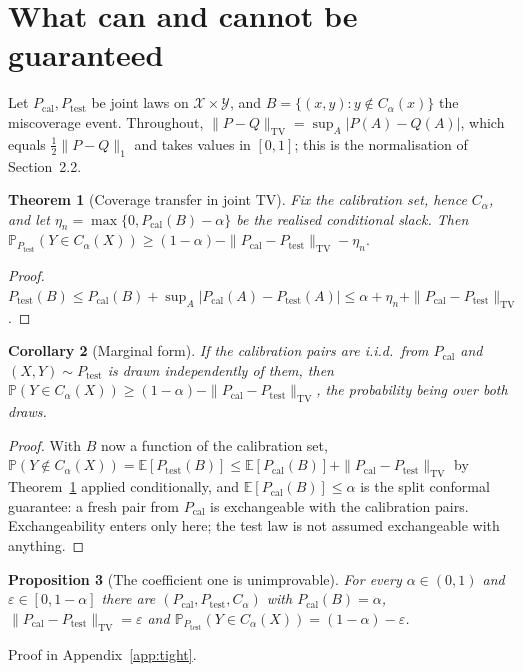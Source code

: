 \documentclass{article}
\newtheorem{theorem}{Theorem}
\newtheorem{proposition}[theorem]{Proposition}
\newtheorem{corollary}[theorem]{Corollary}
\renewcommand{\P}{\mathbb{P}}
\newcommand{\TV}[2]{\|#1 - #2\|_{\mathrm{TV}}}
\newcommand{\Pcal}{P_{\mathrm{cal}}}
\newcommand{\Ptest}{P_{\mathrm{test}}}
\begin{document}
\section{What can and cannot be guaranteed}
\label{sec:main}

Let $\Pcal,\Ptest$ be joint laws on $\mathcal X\times\mathcal Y$, and
$B=\{(x,y):y\notin C_\alpha(x)\}$ the miscoverage event. Throughout,
$\TV{P}{Q}=\sup_A|P(A)-Q(A)|$, which equals $\tfrac12\|P-Q\|_1$ and
takes values in $[0,1]$; this is the normalisation of Section~2.2.

\begin{theorem}[Coverage transfer in joint TV]
\label{thm:tv}
Fix the calibration set, hence $C_\alpha$, and let
$\eta_n=\max\{0,\Pcal(B)-\alpha\}$ be the realised conditional slack. Then
$\P_{\Ptest}(Y\in C_\alpha(X))\ge(1-\alpha)-\TV{\Pcal}{\Ptest}-\eta_n.$
\end{theorem}
\begin{proof}
$\Ptest(B)\le\Pcal(B)+\sup_A|\Pcal(A)-\Ptest(A)|
\le\alpha+\eta_n+\TV{\Pcal}{\Ptest}$.
\end{proof}

\begin{corollary}[Marginal form]
\label{cor:marginal}
If the calibration pairs are i.i.d.\ from $\Pcal$ and $(X,Y)\sim\Ptest$ is
drawn independently of them, then
$\P(Y\in C_\alpha(X))\ge(1-\alpha)-\TV{\Pcal}{\Ptest}$, the probability
being over both draws.
\end{corollary}
\begin{proof}
With $B$ now a function of the calibration set,
$\P(Y\notin C_\alpha(X))=\mathbb E[\Ptest(B)]\le\mathbb E[\Pcal(B)]+\TV{\Pcal}{\Ptest}$
by Theorem~\ref{thm:tv} applied conditionally, and $\mathbb E[\Pcal(B)]\le\alpha$
is the split conformal guarantee: a fresh pair from $\Pcal$ is exchangeable
with the calibration pairs. Exchangeability enters only here; the test law
is not assumed exchangeable with anything.
\end{proof}

\begin{proposition}[The coefficient one is unimprovable]
\label{prop:tight}
For every $\alpha\in(0,1)$ and $\varepsilon\in[0,1-\alpha]$ there are
$(\Pcal,\Ptest,C_\alpha)$ with $\Pcal(B)=\alpha$, $\TV{\Pcal}{\Ptest}=\varepsilon$
and $\P_{\Ptest}(Y\in C_\alpha(X))=(1-\alpha)-\varepsilon$.
\end{proposition}
\noindent Proof in Appendix~\ref{app:tight}.
\end{document}
